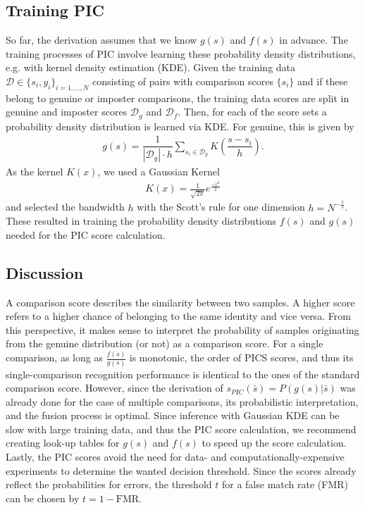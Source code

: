 \documentclass[10pt,twocolumn,letterpaper]{article}
\begin{document}
\subsection{Training PIC}
So far, the derivation assumes that we know $g(s)$ and $f(s)$ in advance.
The training processes of PIC involve learning these probability density distributions, e.g. with kernel density estimation (KDE). 
Given the training data $\mathcal{D}\in \{s_i, y_i\}_{i=1,\dots,N}$ consisting of pairs with comparison scores $\{s_i\}$ and if these belong to genuine or imposter comparisons, the training data scores are split in genuine and imposter scores $\mathcal{D}_{g}$ and $\mathcal{D}_{f}$.
Then, for each of the score sets a probability density distribution is learned via KDE. For genuine, this is given by
\begin{align}
    g(s) = \dfrac{1}{|\mathcal{D}_{g}| \cdot h} \sum_{s_i \in \mathcal{D}_g} K \left( \dfrac{s-s_i}{h} \right). 
\end{align}
As the kernel $K(x)$, we used a Gaussian Kernel
\begin{align}
    K(x) = \frac{1}{\sqrt{2 \pi}} e ^{\frac{-x^2}{2}}
\end{align}
and selected the bandwidth $h$ with the Scott's rule for one dimension $h=N^{-\frac{1}{5}}$.
These resulted in training the probability density distributions $f(s)$ and $g(s)$ needed for the PIC score calculation.


\subsection{Discussion}
A comparison score describes the similarity between two samples.
A higher score refers to a higher chance of belonging to the same identity and vice versa.
From this perspective, it makes sense to interpret the probability of samples originating from the genuine distribution (or not) as a comparison score.
For a single comparison, as long as $\frac{f(s)}{g(s)}$ is monotonic, the order of PICS scores, and thus its single-comparison recognition performance is identical to the ones of the standard comparison score.
However, since the derivation of $s_{PIC}(\bar{s}) = P(g(s)|\bar{s})$ was already done for the case of multiple comparisons, its probabilistic interpretation, and the fusion process is optimal.
Since inference with Gaussian KDE can be slow with large training data, and thus the PIC score calculation, we recommend creating look-up tables for $g(s)$ and $f(s)$ to speed up the score calculation.
Lastly, the PIC scores avoid the need for data- and computationally-expensive experiments to determine the wanted decision threshold.
Since the scores already reflect the probabilities for errors, the threshold $t$ for a false match rate (FMR) can be chosen by $t=1-\text{FMR}$.
\end{document}
